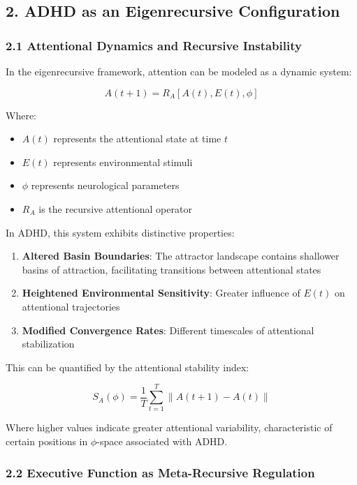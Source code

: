 \documentclass[
]{article}
\providecommand{\tightlist}{%
  \setlength{\itemsep}{0pt}\setlength{\parskip}{0pt}}
\begin{document}
\subsection{2. ADHD as an Eigenrecursive
Configuration}\label{adhd-as-an-eigenrecursive-configuration}

\subsubsection{2.1 Attentional Dynamics and Recursive
Instability}\label{attentional-dynamics-and-recursive-instability}

In the eigenrecursive framework, attention can be modeled as a dynamic
system:

\[A(t+1) = R_A[A(t), E(t), \phi]\]

Where:

\begin{itemize}
\tightlist
\item
  \(A(t)\) represents the attentional state at time \(t\)
\item
  \(E(t)\) represents environmental stimuli
\item
  \(\phi\) represents neurological parameters
\item
  \(R_A\) is the recursive attentional operator
\end{itemize}

In ADHD, this system exhibits distinctive properties:

\begin{enumerate}
\def\labelenumi{\arabic{enumi}.}
\tightlist
\item
  \textbf{Altered Basin Boundaries}: The attractor landscape contains
  shallower basins of attraction, facilitating transitions between
  attentional states
\item
  \textbf{Heightened Environmental Sensitivity}: Greater influence of
  \(E(t)\) on attentional trajectories
\item
  \textbf{Modified Convergence Rates}: Different timescales of
  attentional stabilization
\end{enumerate}

This can be quantified by the attentional stability index:

\[S_A(\phi) = \frac{1}{T}\sum_{t=1}^T \|A(t+1) - A(t)\|\]

Where higher values indicate greater attentional variability,
characteristic of certain positions in \(\phi\)-space associated with
ADHD.

\subsubsection{2.2 Executive Function as Meta-Recursive
Regulation}\label{executive-function-as-meta-recursive-regulation}
\end{document}
